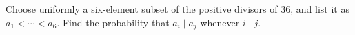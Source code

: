Choose uniformly a six-element subset of the positive divisors of 36, and list it as $a_1<\cdots<a_6$. Find the probability that $a_i\mid a_j$ whenever $i\mid j$.
